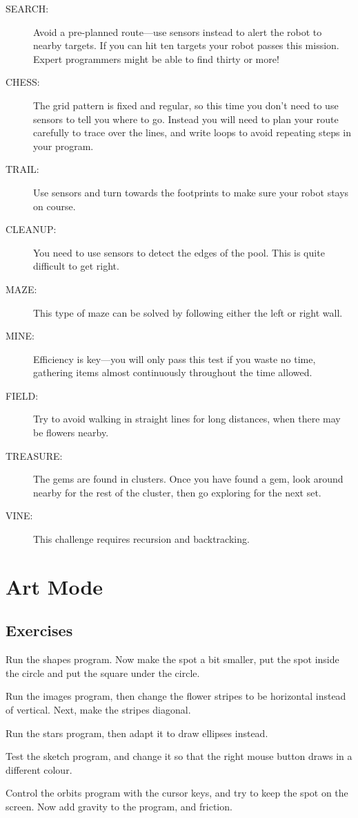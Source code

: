 \documentclass[12pt,a4paper,twoside]{article}
\renewcommand{\_}{\texttt{\symbol{95}}}
\newcommand{\mission}[1]{\item[#1:]}
\begin{document}
\begin{description}
\mission{SEARCH}
	Avoid a pre-planned route---use sensors instead to alert the robot to
	nearby targets. If you can hit ten targets your robot passes
	this mission. Expert programmers might be able to find thirty or more!

\mission{CHESS}
	The grid pattern is fixed and regular, so this time you don't need to
	use sensors to tell you where to go.
	Instead you will need to plan your route carefully to trace over the
	lines, and write loops to avoid repeating steps in your program.

\mission{TRAIL}
	Use sensors and turn towards the footprints to make sure
	your robot stays on course.

\mission{CLEANUP}
	You need to use sensors to detect the edges of the pool.
	This is quite difficult to get right.

\mission{MAZE}
	This type of maze can be solved by
	following either the left or right wall.

\mission{MINE}
	Efficiency is key---you will only pass this test if you
	waste no time, gathering items almost continuously throughout the
	time allowed.

\mission{FIELD}
	Try to avoid walking in straight lines for long distances, when
	there may be flowers nearby.

\mission{TREASURE}
	The gems are found in clusters. Once you have found a
	gem, look around nearby for the rest of the cluster, then
	go exploring for the next set.

\mission{VINE}
	This challenge requires recursion and backtracking.

\end{description}

\newpage
\section{Art Mode}\label{sec:art-mode}

\subsection{Exercises}

\begin{numericlist}
\item Run the shapes program. Now make the spot a bit smaller, put the spot
		inside the circle and put the square under the circle.
\item Run the images program, then change the flower stripes to be horizontal
		instead of vertical. Next, make the stripes diagonal.
\item Run the stars program, then adapt it to draw ellipses instead.
\item Test the sketch program, and change it so that the right mouse
		button draws in a different colour.
\item Control the orbits program with the cursor keys, and try to keep the spot on the screen.
	Now add gravity to the program, and friction.
\end{numericlist}
\end{document}
